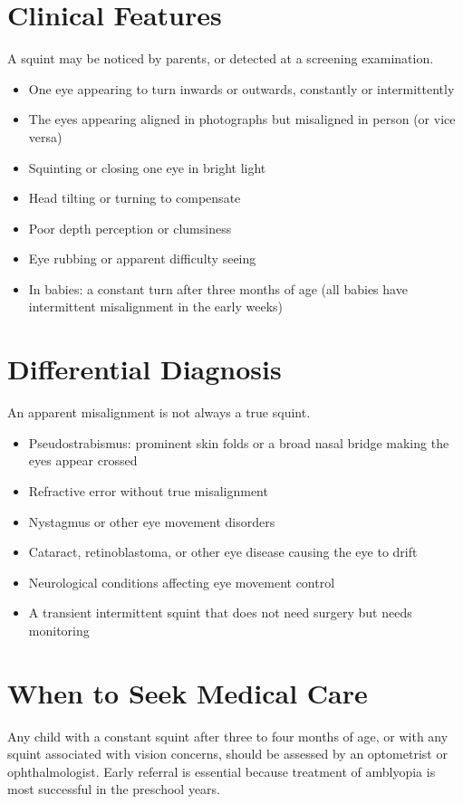 \section*{Clinical Features}
A squint may be noticed by parents, or detected at a screening examination.

\begin{itemize}
    \item One eye appearing to turn inwards or outwards, constantly or intermittently
    \item The eyes appearing aligned in photographs but misaligned in person (or vice versa)
    \item Squinting or closing one eye in bright light
    \item Head tilting or turning to compensate
    \item Poor depth perception or clumsiness
    \item Eye rubbing or apparent difficulty seeing
    \item In babies: a constant turn after three months of age (all babies have intermittent misalignment in the early weeks)
\end{itemize}

\section*{Differential Diagnosis}
An apparent misalignment is not always a true squint.

\begin{itemize}
    \item Pseudostrabismus: prominent skin folds or a broad nasal bridge making the eyes appear crossed
    \item Refractive error without true misalignment
    \item Nystagmus or other eye movement disorders
    \item Cataract, retinoblastoma, or other eye disease causing the eye to drift
    \item Neurological conditions affecting eye movement control
    \item A transient intermittent squint that does not need surgery but needs monitoring
\end{itemize}

\section*{When to Seek Medical Care}
Any child with a constant squint after three to four months of age, or with any squint associated with vision concerns, should be assessed by an optometrist or ophthalmologist. Early referral is essential because treatment of amblyopia is most successful in the preschool years.

